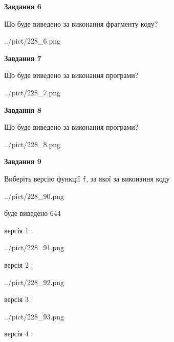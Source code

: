 \documentclass[12pt, ukrainian]{article}
\def\code#1{\Verb!#1!}
\begin{document}
{\begin {large}
{\begin {center}\textbf{Завдання 6}\end {center}}

Що буде виведено за виконання фрагменту коду?\par
\begin{center}
	{../pict/228_6.png}
\end{center}
\newpage

{\begin {center}\textbf{Завдання 7}\end {center}}

Що буде виведено за виконання програми?\par
\begin{center}
	{../pict/228_7.png}
\end{center}
\newpage

{\begin {center}\textbf{Завдання 8}\end {center}}

Що буде виведено за виконання програми?\par
\begin{center}
	{../pict/228_8.png}
\end{center}
\newpage

{\begin {center}\textbf{Завдання 9}\end {center}}

Виберіть версію функції \code{f}, за якої за виконання коду
\begin{center}
	{../pict/228_90.png}
\end{center}
буде виведено 644

\vspace{5mm}
версія 1 :

\begin{center}
	{../pict/228_91.png}
\end{center}
версія 2 :

\begin{center}
	{../pict/228_92.png}
\end{center}
версія 3 :

\begin{center}
	{../pict/228_93.png}
\end{center}
версія 4 :


\end{large}}
\end{document}

